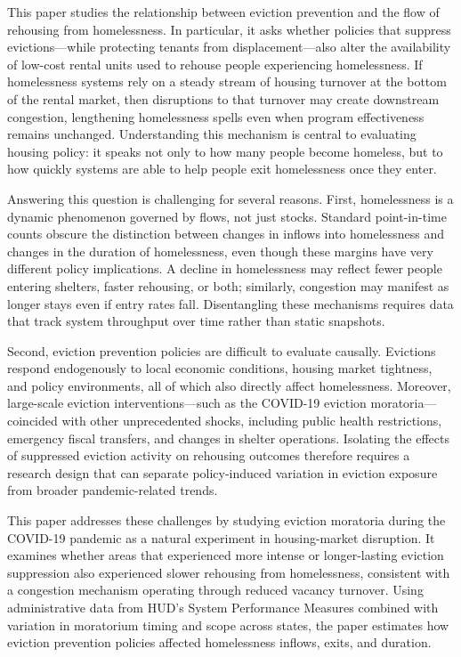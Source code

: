 \documentclass[12pt]{article}
\begin{document}
This paper studies the relationship between eviction prevention and the flow of rehousing from homelessness. In particular, it asks whether policies that suppress evictions—while protecting tenants from displacement—also alter the availability of low-cost rental units used to rehouse people experiencing homelessness. If homelessness systems rely on a steady stream of housing turnover at the bottom of the rental market, then disruptions to that turnover may create downstream congestion, lengthening homelessness spells even when program effectiveness remains unchanged. Understanding this mechanism is central to evaluating housing policy: it speaks not only to how many people become homeless, but to how quickly systems are able to help people exit homelessness once they enter.

 Answering this question is challenging for several reasons. First, homelessness is a dynamic phenomenon governed by flows, not just stocks. Standard point-in-time counts obscure the distinction between changes in inflows into homelessness and changes in the duration of homelessness, even though these margins have very different policy implications. A decline in homelessness may reflect fewer people entering shelters, faster rehousing, or both; similarly, congestion may manifest as longer stays even if entry rates fall. Disentangling these mechanisms requires data that track system throughput over time rather than static snapshots.

Second, eviction prevention policies are difficult to evaluate causally. Evictions respond endogenously to local economic conditions, housing market tightness, and policy environments, all of which also directly affect homelessness. Moreover, large-scale eviction interventions—such as the COVID-19 eviction moratoria—coincided with other unprecedented shocks, including public health restrictions, emergency fiscal transfers, and changes in shelter operations. Isolating the effects of suppressed eviction activity on rehousing outcomes therefore requires a research design that can separate policy-induced variation in eviction exposure from broader pandemic-related trends.

This paper addresses these challenges by studying eviction moratoria during the COVID-19 pandemic as a natural experiment in housing-market disruption. It examines whether areas that experienced more intense or longer-lasting eviction suppression also experienced slower rehousing from homelessness, consistent with a congestion mechanism operating through reduced vacancy turnover. Using administrative data from HUD’s System Performance Measures combined with variation in moratorium timing and scope across states, the paper estimates how eviction prevention policies affected homelessness inflows, exits, and duration.
\end{document}
